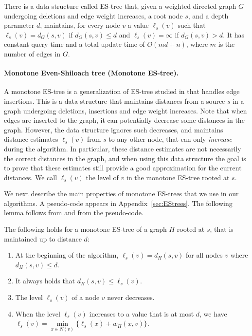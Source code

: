 \begin{lemma}\label{lemma_ES}
There is a data structure called ES-tree that, given a weighted directed graph $G$ undergoing deletions and edge weight increases, a root node $s$, and a depth parameter $d$, maintains, for every node $v$ a value $\ell_s(v)$ such that $\ell_s(v) = d_G(s,v)$ if $d_G(s,v) \leq d$ and $\ell_s(v) = \infty$ if $d_G(s,v) > d$.
It has constant query time and a total update time of $O(md+n)$, where $m$ is the number of edges in $G$.
\end{lemma}

\paragraph{Monotone Even-Shiloach tree (Monotone ES-tree).}
A monotone ES-tree is a generalization of ES-tree studied in \cite{HKN2016,henzinger2014decremental} that handles edge insertions. This is a data structure that maintains distances from a source $s$ in a graph undergoing deletions, insertions and edge weight increases. Note that when edges are inserted to the graph, it can potentially decrease some distances in the graph. However, the data structure ignores such decreases, and maintains distance estimates $\ell_s(v)$ from $s$ to any other node, that can only \emph{increase} during the algorithm. In particular, these distance estimates are not necessarily the correct distances in the graph, and when using this data structure the goal is to prove that these estimates still provide a good approximation for the current distances. We call $\ell_s(v)$ the level of $v$ in the monotone ES-tree rooted at $s$.

We next describe the main properties of monotone ES-trees that we use in our algorithms. A pseudo-code appears in Appendix~\ref{sec:EStrees}. The following lemma follows from \cite{HKN2016} and from the pseudo-code.

\begin{lemma}\label{obs:simple_observations_monotone_ES}
The following holds for a monotone ES-tree of a graph $H$ rooted at $s$, that is maintained up to distance $d$:
\begin{enumerate}[label=(\arabic{*})]
\item At the beginning of the algorithm, $\ell_s(v)=d_H(s,v)$ for all nodes $v$ where $d_H(s,v) \leq d$.\label{obs:beginning}
\item It always holds that $d_H(s,v) \leq \ell_s(v)$.\label{item:easy_side}
\item \label{item: observation one} The level $\ell_s(v)$ of a node $v$ never decreases.
\item When the level $\ell_s(v)$ increases to a value that is at most $d$, we have $\ell_s(v) = \min\limits_{x\in N(v)} \{\ell_s(x)+w_{H}(x,v) \}$.\label{item:change}
\end{enumerate}
\end{lemma}



